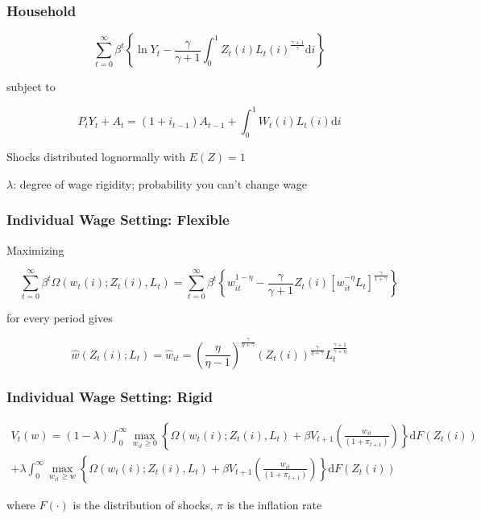 \documentclass{beamer}
\begin{document}
\begin{frame}[t]\frametitle{Household}

    \begin{equation*} \label{eq:utility}
        \sum_{t=0}^{\infty} \beta^t \left\{\ln Y_t - \frac{\gamma}{\gamma + 1} \int_{0}^{1} Z_t(i)L_t(i)^{\frac{\gamma + 1}{\gamma}}\mathup{d}i\right\}
    \end{equation*}

    subject to

    \begin{equation*}
        \label{eq:budget}
        P_t Y_t + A_t = \left(1 + i_{t-1}\right)A_{t-1} + \int_{0}^{1}\! W_t(i)L_t(i)\mathup{d}i
    \end{equation*}

Shocks distributed lognormally with $E(Z) = 1$

$\lambda$: degree of wage rigidity; probability you can't change wage

\end{frame}


\begin{frame}[t]\frametitle{Individual Wage Setting: Flexible}

Maximizing

    \begin{equation*}
        \label{eq:labor_part}
        \sum_{t=0}^{\infty} \beta^t \Omega( w_t(i); Z_t(i), L_t ) = \sum_{t=0}^{\infty} \beta^t \left\{ w_{it}^{1 - \eta} - \frac{\gamma}{\gamma + 1}Z_t(i)\left[ w_{it}^{-\eta}L_t \right]^{\frac{\gamma}{1 + \gamma}} \right\}
    \end{equation*}

for every period gives

    \begin{equation*}
        \label{eq:flex}
        \hat{w}(Z_t(i); L_t) = \hat{w}_{it} = \left( \frac{\eta}{\eta - 1} \right)^{\frac{\gamma}{\eta + \gamma}}\left( Z_t(i) \right)^{\frac{\gamma}{\eta + \gamma}} L_t^{\frac{\gamma + 1}{\gamma + \eta}}
    \end{equation*}


\end{frame}



\begin{frame}[t]\frametitle{Individual Wage Setting: Rigid}
\fontsize{9pt}{12}\selectfont


    \begin{multline*}
        \label{eq:value_function}
        V_t(w) = (1 - \lambda) \int_{0}^{\infty} \max_{w_{it} \geq 0} \left\{ \Omega( w_t(i); Z_t(i), L_t ) + \beta V_{t+1}\left( \frac{w_{it}}{(1 + \pi_{t+1})} \right) \right\} \mathup{d}F(Z_t(i)) \\
                    + \lambda  \int_{0}^{\infty} \max_{w_{it} \geq w} \left\{ \Omega( w_t(i); Z_t(i), L_t ) + \beta V_{t+1}\left( \frac{w_{it}}{(1 + \pi_{t+1})} \right) \right\} \mathup{d}F(Z_t(i))
    \end{multline*}

\fontsize{12pt}{12}\selectfont
where $F(\cdot)$ is the distribution of shocks,
$\pi$ is the inflation rate

\end{frame}
\end{document}
